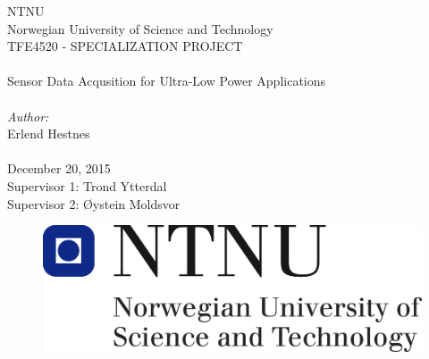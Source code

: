 \thispagestyle{empty}

\begin{center}

\Large{NTNU}\\
\normalsize{Norwegian University of Science and Technology}\\
[3pc]
\Large{TFE4520 - SPECIALIZATION PROJECT}\\

\Huge{\hrulefill\\Sensor Data Acqusition for Ultra-Low Power Applications\\\hrulefill}\\[2pc]

\small{\textit{Author:}}\\\Large{Erlend Hestnes}\\
\mbox{}\\[3pc]
\large{December 20, 2015}\\[2pc]

\small{Supervisor 1: Trond Ytterdal} \\
\small{Supervisor 2: Øystein Moldsvor}

\end{center}
\vfill

\begin{figure}[h]
\centering
\includegraphics[scale=0.5]{fig/NTNU.png}
\label{fig:frontpage_logo}
\end{figure}
